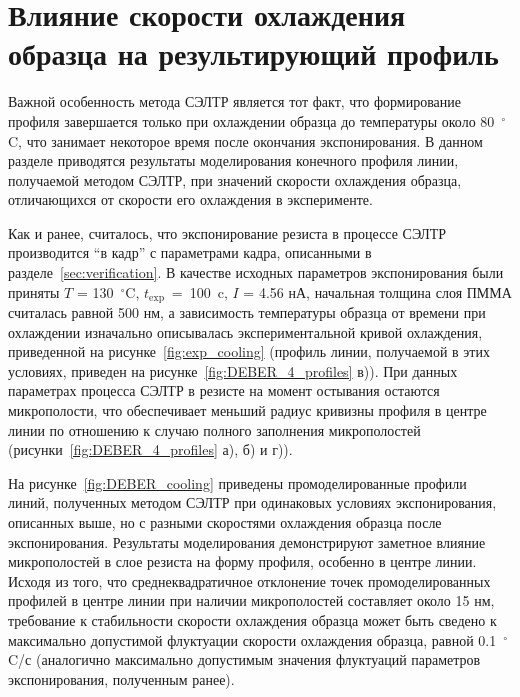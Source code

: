 \section{Влияние скорости охлаждения образца на результирующий профиль}

Важной особенность метода СЭЛТР является тот факт, что формирование профиля завершается только при охлаждении образца до температуры около 80~$^\circ$C, что занимает некоторое время после окончания экспонирования. В данном разделе приводятся результаты моделирования конечного профиля линии, получаемой методом СЭЛТР, при значений скорости охлаждения образца, отличающихся от скорости его охлаждения в эксперименте.

Как и ранее, считалось, что экспонирование резиста в процессе СЭЛТР производится ``в кадр'' с параметрами кадра, описанными в разделе~\ref{sec:verification}. В качестве исходных параметров экспонирования были приняты $T$ = 130~$^\circ$C, $t_\mathrm{exp}$~=~100~c, $I$ = 4.56 нА, начальная толщина слоя ПММА считалась равной 500 нм, а зависимость температуры образца от времени при охлаждении изначально описывалась экспериментальной кривой охлаждения, приведенной на рисунке~\ref{fig:exp_cooling} (профиль линии, получаемой в этих условиях, приведен на рисунке~\ref{fig:DEBER_4_profiles} в)). При данных параметрах процесса СЭЛТР в резисте на момент остывания остаются микрополости, что обеспечивает меньший радиус кривизны профиля в центре линии по отношению к случаю полного заполнения микрополостей (рисунки~\ref{fig:DEBER_4_profiles} а), б) и г)).

На рисунке~\ref{fig:DEBER_cooling} приведены промоделированные профили линий, полученных методом СЭЛТР при одинаковых условиях экспонирования, описанных выше, но с разными скоростями охлаждения образца после экспонирования. Результаты моделирования демонстрируют заметное влияние микрополостей в слое резиста на форму профиля, особенно в центре линии. Исходя из того, что среднеквадратичное отклонение точек промоделированных профилей в центре линии при наличии микрополостей составляет около 15 нм, требование к стабильности скорости охлаждения образца может быть сведено к максимально допустимой флуктуации скорости охлаждения образца, равной 0.1~$^\circ$C/с (аналогично максимально допустимым значения флуктуаций параметров экспонирования, полученным ранее).

